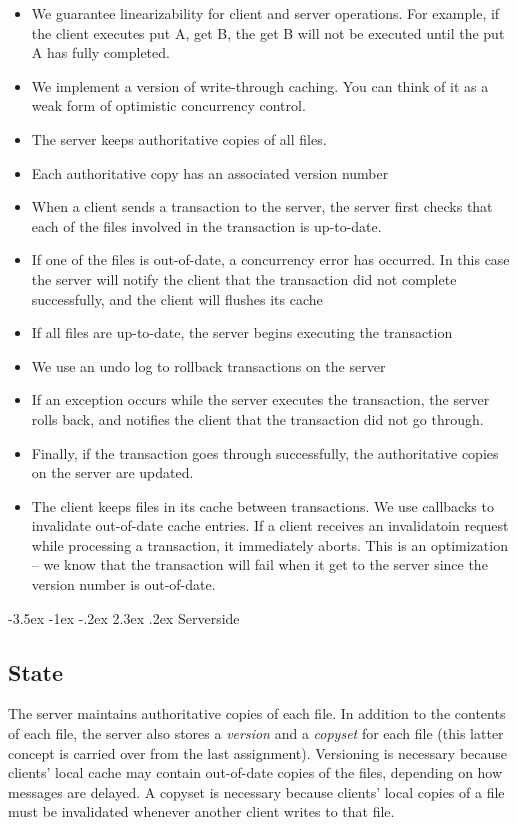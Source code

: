 \documentclass[12pt]{article}
\makeatletter
\renewcommand\section{\@startsection{section}{1}{\z@}%
								 {-3.5ex \@plus -1ex \@minus -.2ex}%
								 {2.3ex \@plus.2ex}%
								 {\normalfont\large\bfseries}}
\makeatother
\begin{document}
\begin{itemize}
\item We guarantee linearizability for client and server operations. For example, if the client executes put A, get B, the get B will not be executed until the put A has fully completed.
\item We implement a version of write-through caching. You can think of it as a weak form of optimistic concurrency control.
\item The server keeps authoritative copies of all files.
\item Each authoritative copy has an associated version number
\item When a client sends a transaction to the server, the server first checks that each of the files involved in the transaction is up-to-date.
\item If one of the files is out-of-date, a concurrency error has occurred. In this case the server will notify the client that the transaction did not complete successfully, and the client will flushes its cache
\item If all files are up-to-date, the server begins executing the transaction
\item We use an undo log to rollback transactions on the server
\item If an exception occurs while the server executes the transaction, the server rolls back, and notifies the client that the transaction did not go through.
\item Finally, if the transaction goes through successfully, the authoritative copies on the server are updated.
\item The client keeps files in its cache between transactions. We use callbacks to invalidate out-of-date cache entries. If a client receives an invalidatoin request while processing a transaction, it immediately aborts. This is an optimization -- we know that the transaction will fail when it get to the server since the version number is out-of-date.
\end{itemize}

\section{Serverside}

\subsection{State}

The server maintains authoritative copies of each file. In addition to the contents of each file, the server also stores a \emph{version} and a \emph{copyset} for each file (this latter concept is carried over from the last assignment). Versioning is necessary because clients' local cache may contain out-of-date copies of the files, depending on how messages are delayed. A copyset is necessary because clients' local copies of a file must be invalidated whenever another client writes to that file.
\end{document}
